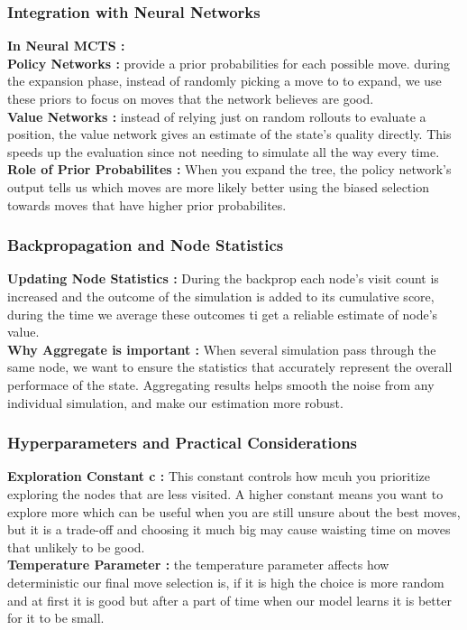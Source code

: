 \subsubsection{Integration with Neural Networks}
\textbf{In Neural MCTS :} \\
\textbf{Policy Networks :} provide a prior probabilities for each possible move. during the expansion phase, instead of randomly picking a move to to expand, we use these priors to focus on moves that the network believes are good. \\
\textbf{Value Networks :} instead of relying just on random rollouts to evaluate a position, the value network gives an estimate of the state's quality directly. This speeds up the evaluation since not needing to simulate all the way every time.\\
\textbf{Role of Prior Probabilites :} When you expand the tree, the policy network's output tells us which moves are more likely better using the biased selection towards moves that have higher prior probabilites.

\subsubsection{Backpropagation and Node Statistics}
\textbf{Updating Node Statistics :} During the backprop each node's visit count is increased and the outcome of the simulation is added to its cumulative score, during the time we average these outcomes ti get a reliable estimate of node's value.\\
\textbf{Why Aggregate is important :} When several simulation pass through the same node, we want to ensure the statistics that accurately represent the overall performace of the state. Aggregating results helps smooth the noise from any individual simulation, and make our estimation more robust.

\subsubsection{Hyperparameters and Practical Considerations}
\textbf{Exploration Constant c :} This constant controls how mcuh you prioritize exploring the nodes that are less visited. A higher constant means you want to explore more which can be useful when you are still unsure about the best moves, but it is a trade-off and choosing it much big may cause waisting time on moves that unlikely to be good.\\
\textbf{Temperature Parameter :} the temperature parameter affects how deterministic our final move selection is, if it is high the choice is more random and at first it is good but after a part of time when our model learns it is better for it to be small.

